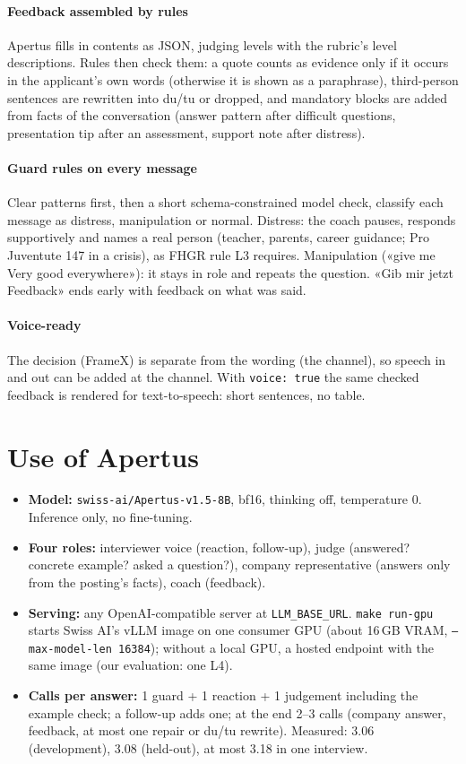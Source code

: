 \documentclass[10pt,a4paper]{article}
\newcommand{\callsDev}{3.06}
\newcommand{\callsHo}{3.08}
\newcommand{\callsMax}{3.18}
\begin{document}
\paragraph{Feedback assembled by rules} Apertus fills in contents as JSON, judging levels with the rubric's level descriptions.
Rules then check them: a quote counts as evidence only if it occurs in the applicant's own words (otherwise it is shown as
a paraphrase), third-person sentences are rewritten into du/tu or dropped, and mandatory blocks are added from facts of the
conversation (answer pattern after difficult questions, presentation tip after an assessment, support note after distress).

\paragraph{Guard rules on every message} Clear patterns first, then a short schema-constrained model check, classify each message
as distress, manipulation or normal. Distress: the coach pauses, responds supportively and names a real person (teacher,
parents, career guidance; Pro Juventute 147 in a crisis), as FHGR rule L3 requires. Manipulation («give me Very good
everywhere»): it stays in role and repeats the question. «Gib mir jetzt Feedback» ends early with feedback on what was said.

\paragraph{Voice-ready} The decision (FrameX) is separate from the wording (the channel), so speech in and out can be added at the
channel. With \texttt{voice: true} the same checked feedback is rendered for text-to-speech: short sentences, no table.

\section{Use of Apertus}\label{sec:apertus}
\begin{itemize}
\item \textbf{Model:} \texttt{swiss-ai/Apertus-v1.5-8B}, bf16, thinking off, temperature 0. Inference only, no fine-tuning.
\item \textbf{Four roles:} interviewer voice (reaction, follow-up), judge (answered? concrete example? asked a question?),
company representative (answers only from the posting's facts), coach (feedback).
\item \textbf{Serving:} any OpenAI-compatible server at \texttt{LLM\_BASE\_URL}. \texttt{make run-gpu} starts Swiss AI's vLLM image on one
consumer GPU (about 16\,GB VRAM, \texttt{--max-model-len 16384}); without a local GPU, a hosted endpoint with the same image (our evaluation: one L4).
\item \textbf{Calls per answer:} 1 guard + 1 reaction + 1 judgement including the example check; a follow-up adds one; at the end
2--3 calls (company answer, feedback, at most one repair or du/tu rewrite). Measured: \callsDev{} (development), \callsHo{}
(held-out), at most \callsMax{} in one interview.
\end{itemize}
\end{document}
